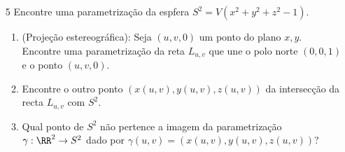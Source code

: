  \begin{enumerate}
 \item[5] Encontre uma parametrização da espfera $S^2=V(x^2+y^2+z^2-1)$.
 \begin{enumerate}
 \item (Projeção estereográfica): Seja $(u,v,0)$ um ponto do plano $x,y$. Encontre uma parametrização da reta $L_{u,v}$ que une  o polo norte $(0,0,1)$ e o ponto $(u,v,0)$.
 \item Encontre o outro ponto $(x(u,v),y(u,v),z(u,v))$ da intersecção da recta $L_{u,v}$ com $S^2$.
 \item Qual ponto de $S^2$ não pertence a imagem da parametrização $\gamma: \RR^2 \rightarrow S^2$ dado por $\gamma(u,v)=(x(u,v), y(u,v), z(u,v))$?
 \end{enumerate}
 \end{enumerate}




